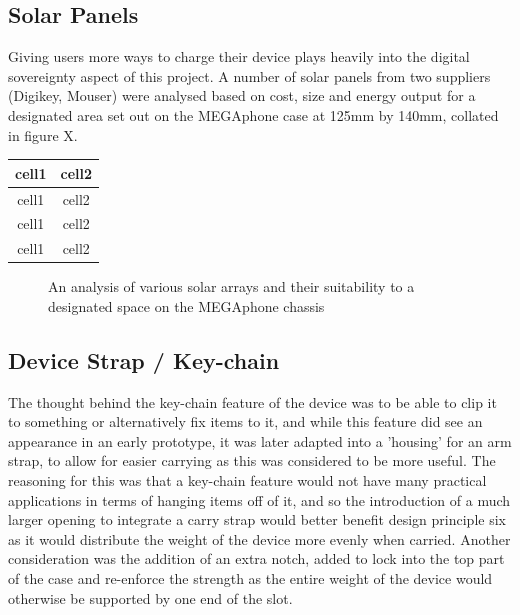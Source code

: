 
\subsection{Solar Panels}

Giving users more ways to charge their device plays heavily into the digital sovereignty aspect of this project.
A number of solar panels from two suppliers (Digikey, Mouser) were analysed based on cost, size and energy output for a designated area set out on the MEGAphone case at 125mm by 140mm, collated in figure X.

\begin{center}
    \begin{tabular}{ |c|c| } 
    \hline
    cell1 & cell2 \\
    \hline
    cell1 & cell2 \\ 
    \hline
    cell1 & cell2 \\ 
    \hline
    cell1 & cell2 \\
    \hline
    \end{tabular}
\end{center}

\begin{figure}
    \caption{An analysis of various solar arrays and their suitability to a designated space on the MEGAphone chassis}
    \label{fig:DesignPrinciples}
\end{figure}

\subsection{Device Strap / Key-chain}

The thought behind the key-chain feature of the device was to be able to clip it to something or alternatively fix items to it, and while this feature did see an appearance in an early prototype, it was later adapted into a 'housing' for an arm strap, to allow for easier carrying as this was considered to be more useful.
The reasoning for this was that a key-chain feature would not have many practical applications in terms of hanging items off of it, and so the introduction of a much larger opening to integrate a carry strap would better benefit design principle six as it would distribute the weight of the device more evenly when carried.
Another consideration was the addition of an extra notch, added to lock into the top part of the case and re-enforce the strength as the entire weight of the device would otherwise be supported by one end of the slot. %

